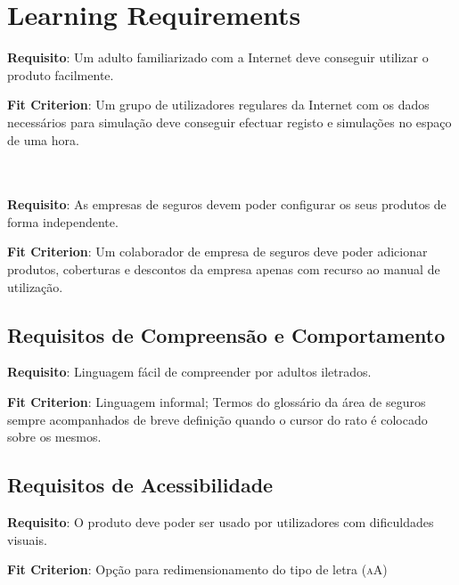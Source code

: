 \section{Learning Requirements}
\begin{description}
\item \textbf{Requisito}: Um adulto familiarizado com a Internet deve conseguir utilizar o produto facilmente.\\

\item \textbf{Fit Criterion}: Um grupo de utilizadores regulares da Internet com os dados necessários para simulação deve conseguir efectuar registo e simulações no espaço de uma hora.\\\\\\

\item \textbf{Requisito}: As empresas de seguros devem poder configurar os seus produtos de forma independente.\\

\item \textbf{Fit Criterion}: Um colaborador de empresa de seguros deve poder adicionar produtos, coberturas e descontos da empresa apenas com recurso ao manual de utilização.
\end{description}


\subsection{Requisitos de Compreensão e Comportamento}
\begin{description}
\item \textbf{Requisito}: Linguagem fácil de compreender por adultos iletrados.\\

\item \textbf{Fit Criterion}: Linguagem informal; Termos do glossário da área de seguros sempre acompanhados de breve definição quando o cursor do rato é colocado sobre os mesmos.
\end{description}


\subsection{Requisitos de Acessibilidade}
\begin{description}
\item \textbf{Requisito}: O produto deve poder ser usado por utilizadores com dificuldades visuais.\\

\item \textbf{Fit Criterion}: Opção para redimensionamento do tipo de letra (\textsc{a}A)
\end{description}


